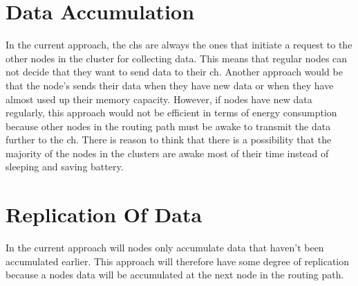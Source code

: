 \documentclass[USenglish]{uit-thesis}
\begin{document}
\section{Data Accumulation} \label{disc:data_acc}



In the current approach, the \glspl{ch} are always the ones that initiate a request to the other nodes in the cluster for collecting data. This means that regular nodes can not decide that they want to send data to their \gls{ch}. Another approach would be that the node's sends their data when they have new data or when they have almost used up their memory capacity. However, if nodes have new data regularly, this approach would not be efficient in terms of energy consumption because other nodes in the routing path must be awake to transmit the data further to the \gls{ch}. There is reason to think that there is a possibility that the majority of the nodes in the clusters are awake most of their time instead of sleeping and saving battery. 





\section{Replication Of Data} \label{disc:repl_data}
In the current approach will nodes only accumulate data that haven't been accumulated earlier. This approach will therefore have some degree of replication because a nodes data will be accumulated at the next node in the routing path.
\end{document}
